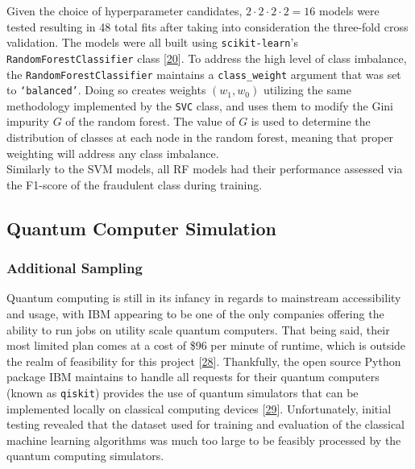 \documentclass[11pt, oneside]{article}   	%
\begin{document}
Given the choice of hyperparameter candidates, $2\cdot 2\cdot 2 \cdot 2 = 16$ models were tested resulting in 48 total fits after taking into consideration the three-fold cross validation. The models were all built using \texttt{scikit-learn}'s \texttt{RandomForestClassifier} class  [\href{https://www.nature.com/articles/s41592-019-0686-2}{20}]. To address the high level of class imbalance, the \texttt{RandomForestClassifier} maintains a \texttt{class\_weight} argument that was set to \texttt{`balanced'}. Doing so creates weights $(w_1, w_0)$ utilizing the same methodology implemented by the \texttt{SVC} class, and uses them to modify the Gini impurity $G$ of the random forest. The value of $G$ is used to determine the distribution of classes at each node in the random forest, meaning that proper weighting will address any class imbalance. \\

Similarly to the SVM models, all RF models had their performance assessed via the F1-score of the fraudulent class during training.  




\subsection{Quantum Computer Simulation}




\subsubsection{Additional Sampling}

Quantum computing is still in its infancy in regards to mainstream accessibility and usage, with IBM appearing to be one of the only companies offering the ability to run jobs on utility scale quantum computers. That being said, their most limited plan comes at a cost of \$96 per minute of runtime, which is outside the realm of feasibility for this project [\href{https://www.ibm.com/quantum/pricing}{28}]. Thankfully, the open source Python package IBM maintains to handle all requests for their quantum computers (known as \texttt{qiskit}) provides the use of quantum simulators that can be implemented locally on classical computing devices [\href{https://doi.org/10.48550/arXiv.2405.08810}{29}]. Unfortunately, initial testing revealed that the dataset used for training and evaluation of the classical machine learning algorithms was much too large to be feasibly processed by the quantum computing simulators. \\
\end{document}
